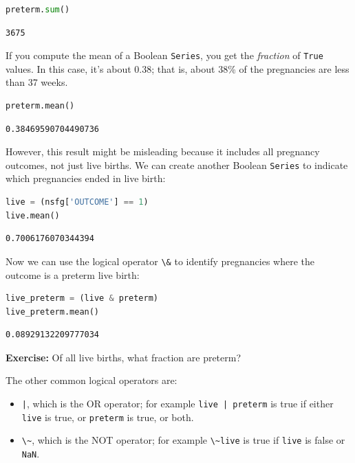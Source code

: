 \begin{lstlisting}[language=Python]
preterm.sum()
\end{lstlisting}

\begin{lstlisting}[]
3675
\end{lstlisting}

If you compute the mean of a Boolean \passthrough{\lstinline!Series!},
you get the \emph{fraction} of \passthrough{\lstinline!True!} values. In
this case, it's about 0.38; that is, about 38\% of the pregnancies are
less than 37 weeks.

\begin{lstlisting}[language=Python]
preterm.mean()
\end{lstlisting}

\begin{lstlisting}[]
0.38469590704490736
\end{lstlisting}

However, this result might be misleading because it includes all
pregnancy outcomes, not just live births. We can create another Boolean
\passthrough{\lstinline!Series!} to indicate which pregnancies ended in
live birth:

\begin{lstlisting}[language=Python]
live = (nsfg['OUTCOME'] == 1)
live.mean()
\end{lstlisting}

\begin{lstlisting}[]
0.7006176070344394
\end{lstlisting}

Now we can use the logical operator \passthrough{\lstinline!\&!} to
identify pregnancies where the outcome is a preterm live birth:

\begin{lstlisting}[language=Python]
live_preterm = (live & preterm)
live_preterm.mean()
\end{lstlisting}

\begin{lstlisting}[]
0.08929132209777034
\end{lstlisting}

\textbf{Exercise:} Of all live births, what fraction are preterm?

The other common logical operators are:

\begin{itemize}
\item
  \passthrough{\lstinline!|!}, which is the OR operator; for example
  \passthrough{\lstinline!live | preterm!} is true if either
  \passthrough{\lstinline!live!} is true, or
  \passthrough{\lstinline!preterm!} is true, or both.
\item
  \passthrough{\lstinline!\~!}, which is the NOT operator; for example
  \passthrough{\lstinline!\~live!} is true if
  \passthrough{\lstinline!live!} is false or
  \passthrough{\lstinline!NaN!}.
\end{itemize}

